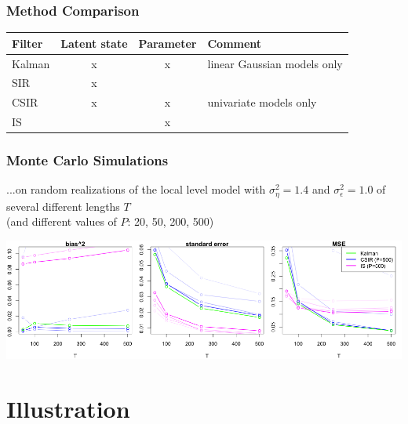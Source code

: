 \documentclass[11pt]{beamer}
\begin{document}
\begin{frame}
\end{frame}

\begin{frame}
\frametitle{Method Comparison}
\begin{table}
\centering
\begin{tabular}{lccl}
\hline
Filter  & Latent state & Parameter & Comment\\
\hline
Kalman    & x & x & linear Gaussian models only\\
SIR      & x & &\\
CSIR      & x & x & univariate models only\\
IS      & & x & \\
\hline
\end{tabular}
\end{table}
\end{frame}

\begin{frame}
\frametitle{Monte Carlo Simulations}
...on random realizations of the local level model with $\sigma_{\eta}^2=1.4$ and $\sigma_{\epsilon}^2=1.0$ of several different lengths $T$ \\(and different values of $P$: 20, 50, 200, 500)
\bigskip
\begin{center}
\includegraphics[scale=0.33]{ullm-mc-mle}
\end{center}
\end{frame}

\section{Illustration}
\end{document}
